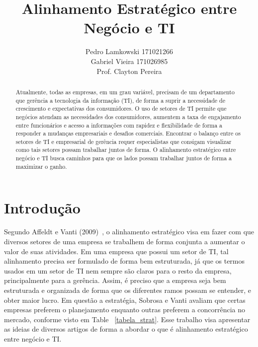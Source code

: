 \documentclass[review]{elsarticle}
\begin{document}
\begin{abstract}

Atualmente, todas as empresas, em um grau variável, precisam de um departamento que gerência a tecnologia da informação (TI), de forma a suprir a necessidade de crescimento e expectativas dos consumidores. O uso de setores de TI permite que negócios atendam as necessidades dos consumidores, aumentem a taxa de engajamento entre funcionários e acesso a informações com rapidez e flexibilidade de forma a responder a mudanças empresariais e desafios comerciais. Encontrar o balanço entre os setores de TI e empresarial de gerência requer especialistas que consigam visualizar como tais setores possam trabalhar juntos de forma. O alinhamento estratégico entre negócio e TI busca caminhos para que os lados possam trabalhar juntos de forma a maximizar o ganho.~\cite{Edmead2016,wikibit2018}


\end{abstract}

\title{Alinhamento Estratégico entre Negócio e TI}


\author{Pedro Lamkowski 171021266 \\ Gabriel Vieira 171026985 \\ Prof. Clayton Pereira}%


\maketitle


\section{Introdução}
Segundo Affeldt e Vanti (2009)~\cite{Sobrosa2009}, o alinhamento estratégico visa em fazer com que diversos setores de uma empresa se trabalhem de forma conjunta a aumentar o valor de suas atividades. Em uma empresa que possui um setor de TI, tal alinhamento precisa ser formulado de forma bem estruturada, já que os termos usados em um setor de TI nem sempre são claros para o resto da empresa, principalmente para a gerência. Assim, é preciso que a empresa seja bem estruturada e organizada de forma que os diferentes ramos possam se entender, e obter maior lucro. Em questão a estratégia, Sobrosa e Vanti avaliam que certas empresas preferem o planejamento enquanto outras preferem a concorrência no mercado, conforme visto em Table ~\ref{tabela_strat}. Esse trabalho visa apresentar as ideias de diversos artigos de forma a abordar o que é alinhamento estratégico entre negócio e TI.
\end{document}
